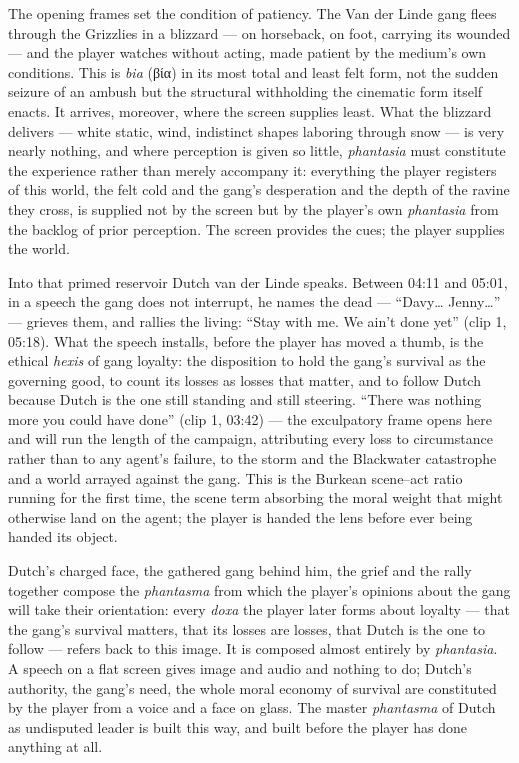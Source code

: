 \documentclass{article}
\newcommand{\gk}[1]{{\greekfont #1}}
\begin{document}
The opening frames set the condition of patiency. The Van der Linde gang flees through the Grizzlies in a blizzard — on horseback, on foot, carrying its wounded — and the player watches without acting, made patient by the medium's own conditions. This is \textit{bia} (\gk{βία}) in its most total and least felt form, not the sudden seizure of an ambush but the structural withholding the cinematic form itself enacts. It arrives, moreover, where the screen supplies least. What the blizzard delivers — white static, wind, indistinct shapes laboring through snow — is very nearly nothing, and where perception is given so little, \textit{phantasia} must constitute the experience rather than merely accompany it: everything the player registers of this world, the felt cold and the gang's desperation and the depth of the ravine they cross, is supplied not by the screen but by the player's own \textit{phantasia} from the backlog of prior perception. The screen provides the cues; the player supplies the world.

Into that primed reservoir Dutch van der Linde speaks. Between 04:11 and 05:01, in a speech the gang does not interrupt, he names the dead — ``Davy… Jenny…'' — grieves them, and rallies the living: ``Stay with me. We ain't done yet'' (clip 1, 05:18). What the speech installs, before the player has moved a thumb, is the ethical \textit{hexis} of gang loyalty: the disposition to hold the gang's survival as the governing good, to count its losses as losses that matter, and to follow Dutch because Dutch is the one still standing and still steering. ``There was nothing more you could have done'' (clip 1, 03:42) — the exculpatory frame opens here and will run the length of the campaign, attributing every loss to circumstance rather than to any agent's failure, to the storm and the Blackwater catastrophe and a world arrayed against the gang. This is the Burkean scene–act ratio running for the first time, the scene term absorbing the moral weight that might otherwise land on the agent; the player is handed the lens before ever being handed its object.

Dutch's charged face, the gathered gang behind him, the grief and the rally together compose the \textit{phantasma} from which the player's opinions about the gang will take their orientation: every \textit{doxa} the player later forms about loyalty — that the gang's survival matters, that its losses are losses, that Dutch is the one to follow — refers back to this image. It is composed almost entirely by \textit{phantasia}. A speech on a flat screen gives image and audio and nothing to do; Dutch's authority, the gang's need, the whole moral economy of survival are constituted by the player from a voice and a face on glass. The master \textit{phantasma} of Dutch as undisputed leader is built this way, and built before the player has done anything at all.
\end{document}
